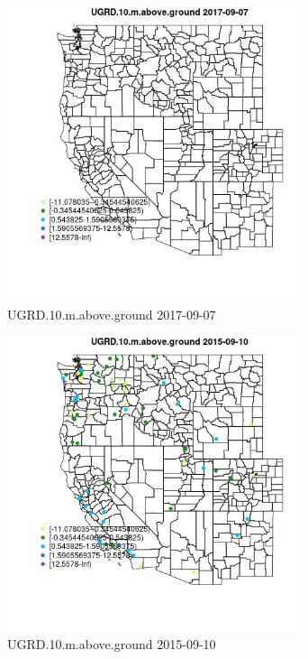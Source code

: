 \begin{figure} 
\centering  
\includegraphics[width=0.77\textwidth]{Code_Outputs/Report_ML_input_PM25_Step4_part_e_de_duplicated_aveswNAs_MapObsUGRD10maboveground2017-09-07.jpg} 
\caption{\label{fig:Report_ML_input_PM25_Step4_part_e_de_duplicated_aveswNAsMapObsUGRD10maboveground2017-09-07}UGRD.10.m.above.ground 2017-09-07} 
\end{figure} 
 

\begin{figure} 
\centering  
\includegraphics[width=0.77\textwidth]{Code_Outputs/Report_ML_input_PM25_Step4_part_e_de_duplicated_aveswNAs_MapObsUGRD10maboveground2015-09-10.jpg} 
\caption{\label{fig:Report_ML_input_PM25_Step4_part_e_de_duplicated_aveswNAsMapObsUGRD10maboveground2015-09-10}UGRD.10.m.above.ground 2015-09-10} 
\end{figure} 
 

